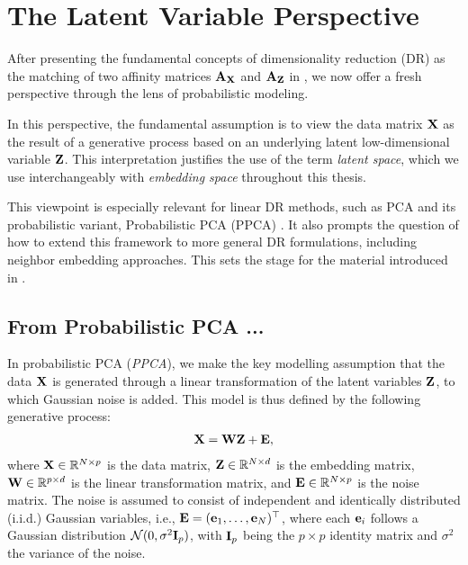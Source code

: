 \section{The Latent Variable Perspective}\label{sec:dr_proba_modelling}

After presenting the fundamental concepts of dimensionality reduction (DR) as the matching of two affinity matrices ${\mathbf{A}}_{{\mathbf{X}}}$ and ${\mathbf{A}}_{{\mathbf{Z}}}$ in , we now offer a fresh perspective through the lens of probabilistic modeling.

In this perspective, the fundamental assumption is to view the data matrix ${\mathbf{X}}$ as the result of a generative process based on an underlying latent low-dimensional variable ${\mathbf{Z}}$. This interpretation justifies the use of the term \emph{latent space}, which we use interchangeably with \emph{embedding space} throughout this thesis.

This viewpoint is especially relevant for linear DR methods, such as PCA and its probabilistic variant, Probabilistic PCA (PPCA) \citep{tipping1999probabilistic}. It also prompts the question of how to extend this framework to more general DR formulations, including neighbor embedding approaches. This sets the stage for the material introduced in .

\subsection{From Probabilistic PCA ...}\label{sec:ppca}

In probabilistic PCA (\emph{PPCA}), we make the key modelling assumption that the data ${\mathbf{X}}$ is generated through a linear transformation of the latent variables ${\mathbf{Z}}$, to which Gaussian noise is added. This model is thus defined by the following generative process:
\begin{align}
    {\mathbf{X}} = {\mathbf{W}} {\mathbf{Z}} + {\mathbf{E}},
\end{align}
where ${\mathbf{X}} \in \mathbb{R}^{N \times p}$ is the data matrix, ${\mathbf{Z}} \in \mathbb{R}^{N \times d}$ is the embedding matrix, ${\mathbf{W}} \in \mathbb{R}^{p \times d}$ is the linear transformation matrix, and ${\mathbf{E}} \in \mathbb{R}^{N \times p}$ is the noise matrix. The noise is assumed to consist of independent and identically distributed (i.i.d.) Gaussian variables, i.e., ${\mathbf{E}} = ({\mathbf{e}}_1, \ldots, {\mathbf{e}}_N)^\top$, where each ${\mathbf{e}}_i$ follows a Gaussian distribution $\mathcal{N}(0, \sigma^2 {\mathbf{I}}_p)$, with ${\mathbf{I}}_p$ being the $p \times p$ identity matrix and $\sigma^2$ the variance of the noise.

